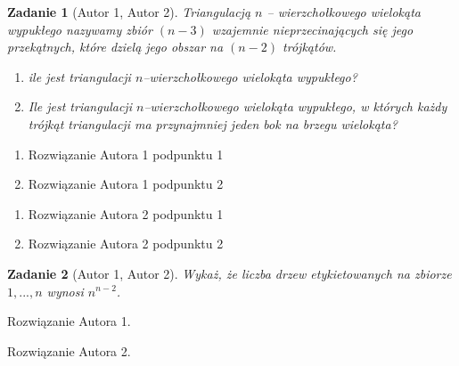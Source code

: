 \documentclass{mwart}
\newtheorem{zad}{Zadanie}[section]
\begin{document}
\begin{zad}[Autor 1, Autor 2]
    Triangulacją $n$ -- wierzchołkowego wielokąta wypukłego nazywamy zbiór
    $(n - 3)$ wzajemnie nieprzecinających się jego przekątnych, które dzielą jego obszar na
    $(n - 2)$ trójkątów.
    \begin{enumerate}
        \item ile jest triangulacji $n$--wierzchołkowego wielokąta wypukłego?
        \item Ile jest triangulacji $n$--wierzchołkowego wielokąta wypukłego, w których każdy trójkąt
              triangulacji ma przynajmniej jeden bok na brzegu wielokąta?
    \end{enumerate}
\end{zad}
\begin{mdframed}
    \begin{enumerate}
        \item Rozwiązanie Autora 1 podpunktu 1
        \item Rozwiązanie Autora 1 podpunktu 2
    \end{enumerate}
\end{mdframed}
\begin{mdframed}
    \begin{enumerate}
        \item Rozwiązanie Autora 2 podpunktu 1
        \item Rozwiązanie Autora 2 podpunktu 2
    \end{enumerate}
\end{mdframed}




\begin{zad}[Autor 1, Autor 2]
    Wykaż, że liczba drzew etykietowanych na zbiorze ${1, ..., n}$ wynosi $n^{n-2}$.
\end{zad}
\begin{mdframed}
    Rozwiązanie Autora 1.
\end{mdframed}
\begin{mdframed}
    Rozwiązanie Autora 2.
\end{mdframed}
\end{document}
